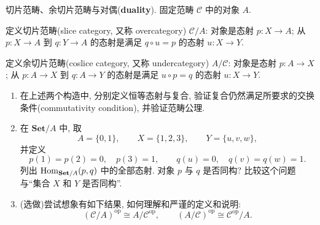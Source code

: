 \documentclass{article}
\newcommand{\op}{^{\mathrm{op}}}
\begin{document}
\begin{problem}
  {\heiti 切片范畴、余切片范畴与对偶}(\textbf{duality}). 固定范畴 $\mathcal C$ 中的对象 $A$.

  定义切片范畴(slice category, 又称 overcategory) $\mathcal C/A$: 对象是态射 $p:X\to A$; 从 $p:X\to A$ 到 $q:Y\to A$ 的态射是满足 $q\circ u=p$ 的态射 $u:X\to Y$.

  定义余切片范畴(coslice category, 又称 undercategory) $A/\mathcal C$: 对象是态射 $p:A\to X$; 从 $p:A\to X$ 到 $q:A\to Y$ 的态射是满足 $u\circ p=q$ 的态射 $u:X\to Y$.

  \begin{enumerate}
    \item[(a)] 在上述两个构造中, 分别定义恒等态射与复合, 验证复合仍然满足所要求的交换条件(commutativity condition), 并验证范畴公理.

    \item[(b)] 在 $\mathbf{Set}/A$ 中, 取
      \[
        A=\{0,1\},\qquad X=\{1,2,3\},\qquad Y=\{u,v,w\},
      \]
      并定义
      \[
        p(1)=p(2)=0,\quad p(3)=1,\qquad q(u)=0,\quad q(v)=q(w)=1.
      \]
      列出 $\operatorname{Hom}_{\mathbf{Set}/A}(p,q)$ 中的全部态射. 对象 $p$ 与 $q$ 是否同构? 比较这个问题与``集合 $X$ 和 $Y$ 是否同构''.

    \item[(c)] (选做)尝试想象有如下结果, 如何理解和严谨的定义和说明:
      \[
        (\mathcal C/A)\op\cong A/\mathcal C\op,\qquad
        (A/\mathcal C)\op\cong\mathcal C\op/A.
      \]
  \end{enumerate}
\end{problem}
\end{document}
